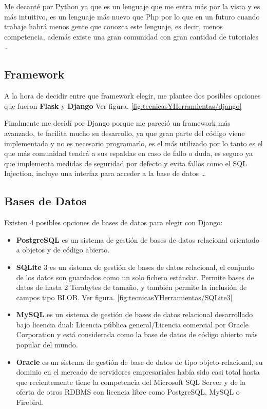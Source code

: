 Me decanté por Python ya que es un lenguaje que me entra más por la vista y es más intuitivo, es un lenguaje más nuevo que Php por lo que en un futuro cuando trabaje habrá menos gente que conozca este lenguaje, es decir, menos competencia, además existe una gran comunidad con gran cantidad de tutoriales \ldots

\newpage
\subsection{Framework}

A la hora de decidir entre que framework elegir, me plantee dos posibles opciones que fueron \textbf{Flask} \cite{Flask} y \textbf{Django} \cite{Django} Ver figura. \ref{fig:tecnicasYHerramientas/django}

Finalmente me decidí por Django porque me pareció un framework más avanzado, te facilita mucho su desarrollo, ya que gran parte del código viene implementada y no es necesario programarlo, es el más utilizado por lo tanto es el que más comunidad tendrá a sus espaldas en caso de fallo o duda, es seguro ya que implementa medidas de seguridad por defecto y evita fallos como el SQL Injection, incluye una interfaz para acceder a la base de datos \ldots


\subsection{Bases de Datos}

Existen 4 posibles opciones de bases de datos para elegir con Django:
	\begin{itemize}
	\item \textbf{PostgreSQL} \cite{PostgreSQL} es un sistema de gestión de bases de datos relacional orientado a objetos y de código abierto. 
	\item \textbf{SQLite} 3 \cite{SQLite3} es un sistema de gestión de bases de datos relacional, el conjunto de los datos son guardados como un solo fichero estándar. Permite bases de datos de hasta 2 Terabytes de tamaño, y también permite la inclusión de campos tipo BLOB. Ver figura. \ref{fig:tecnicasYHerramientas/SQLite3}
	\item \textbf{MySQL} \cite{MySQL} es un sistema de gestión de bases de datos relacional desarrollado bajo licencia dual: Licencia pública general/Licencia comercial por Oracle Corporation y está considerada como la base de datos de código abierto más popular del mundo.
	\item \textbf{Oracle} \cite{Oracle} es un sistema de gestión de base de datos de tipo objeto-relacional, su dominio en el mercado de servidores empresariales había sido casi total hasta que recientemente tiene la competencia del Microsoft SQL Server y de la oferta de otros RDBMS con licencia libre como PostgreSQL, MySQL o Firebird.
	\end{itemize}

